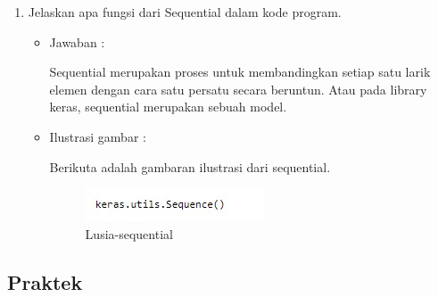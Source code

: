 \begin{enumerate}
\item Jelaskan apa fungsi dari Sequential dalam kode program.
	\begin{itemize}
	\item Jawaban :
		\par Sequential merupakan proses untuk membandingkan setiap satu larik elemen dengan cara satu persatu secara beruntun. Atau pada library keras, sequential merupakan sebuah model.
	\item Ilustrasi gambar :
		\par Berikuta adalah gambaran ilustrasi dari sequential.
		\begin{figure}[!hbtp]
		\centering
		\includegraphics[scale=0.4]{figures/s8.jpg}
		\caption{Lusia-sequential}
		\label{6A9}
		\end{figure}
	\end{itemize}
\end{enumerate}

\subsection{Praktek}